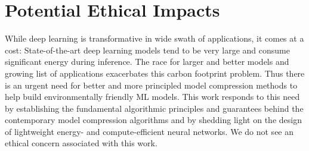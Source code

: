 \documentclass[letterpaper]{article} %
\begin{document}
\section*{Potential Ethical Impacts}
While deep learning is transformative in wide swath of applications, it comes at a cost: State-of-the-art deep learning models tend to be very large and consume significant energy during inference. The race for larger and better models and growing list of applications exacerbates this carbon footprint problem. Thus there is an urgent need for better and more principled model compression methods to help build environmentally friendly ML models. This work responds to this need by establishing the fundamental algorithmic principles and guarantees behind the contemporary model compression algorithms and by shedding light on the design of lightweight energy- and compute-efficient neural networks. We do not see an ethical concern associated with this work.

%





%



\appendix
\onecolumn
\end{document}
